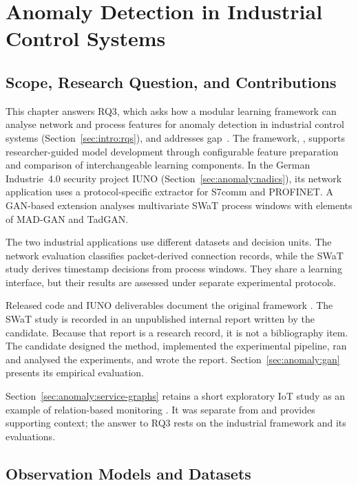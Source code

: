 \chapter{Anomaly Detection in Industrial Control Systems}
\label{chap:anomaly}

\section{Scope, Research Question, and Contributions}
\label{sec:anomaly:scope}
\label{sec:anomaly:1}

This chapter answers RQ3, which asks how a modular learning framework can analyse network and
process features for anomaly detection in industrial control systems
(Section~\ref{sec:intro:rqs}), and addresses gap~. The framework, \nadics{}, supports
researcher-guided model development through configurable feature preparation and comparison of
interchangeable learning components. In the German Industrie~4.0
security project IUNO (Section~\ref{sec:anomaly:nadics}), its network application
uses a protocol-specific extractor for S7comm and PROFINET. A GAN-based extension analyses
multivariate SWaT process windows with elements of MAD-GAN and TadGAN.

The two industrial applications use different datasets and decision units. The network
evaluation classifies packet-derived connection records, while the SWaT study derives timestamp
decisions from process windows. They share a learning interface, but their results are assessed
under separate experimental protocols.

Released code and IUNO deliverables document the original framework \cite{iuno_ap4,iuno_ap7}.
The SWaT study is recorded in an unpublished internal report written by the candidate. Because
that report is a research record, it is not a bibliography item. The candidate designed the
method, implemented the experimental pipeline, ran and analysed the experiments, and wrote the
report. Section~\ref{sec:anomaly:gan} presents its empirical evaluation.

Section~\ref{sec:anomaly:service-graphs} retains a short exploratory IoT study as an example of
relation-based monitoring \cite{aubet2018graph}. It was separate from \nadics{} and provides
supporting context; the answer to RQ3 rests on the industrial framework and its evaluations.

\section{Observation Models and Datasets}
\label{sec:anomaly:observation}

